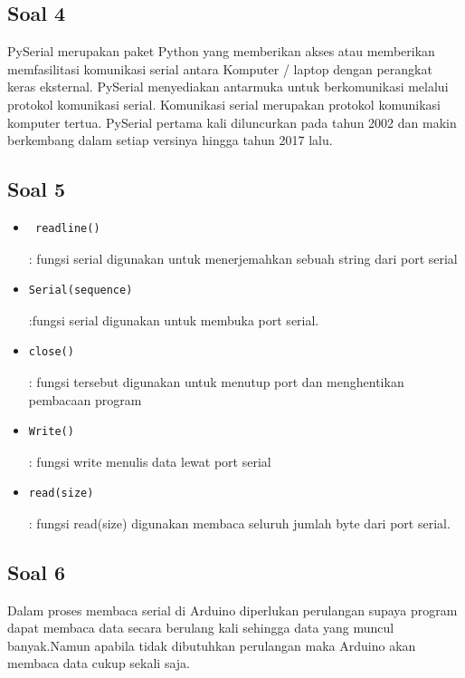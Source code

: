 	\subsection{Soal 4}
PySerial merupakan paket Python yang memberikan akses atau memberikan memfasilitasi komunikasi serial antara Komputer / laptop dengan perangkat keras eksternal. PySerial menyediakan antarmuka untuk berkomunikasi melalui protokol komunikasi serial. Komunikasi serial merupakan protokol komunikasi komputer tertua. PySerial pertama kali diluncurkan pada tahun 2002 dan makin berkembang dalam setiap versinya hingga tahun 2017 lalu.

	\subsection{Soal 5}
		\begin{itemize}
			\item \begin{verbatim} readline()\end{verbatim} : fungsi serial digunakan untuk menerjemahkan sebuah string dari port serial
			\item \begin{verbatim}Serial(sequence)\end{verbatim} :fungsi serial digunakan untuk membuka port serial.
			\item \begin{verbatim}close()\end{verbatim} : fungsi tersebut digunakan untuk menutup port  dan menghentikan pembacaan program
			\item \begin{verbatim}Write()\end{verbatim} : fungsi write menulis data lewat port serial 
			\item \begin{verbatim}read(size)\end{verbatim}	: fungsi read(size) digunakan membaca seluruh jumlah byte dari port serial.
		\end{itemize}

	\subsection{Soal 6}
	Dalam proses membaca serial di Arduino diperlukan perulangan supaya program dapat membaca data secara berulang kali sehingga data yang muncul banyak.Namun apabila tidak dibutuhkan perulangan maka Arduino akan membaca data cukup sekali saja.


